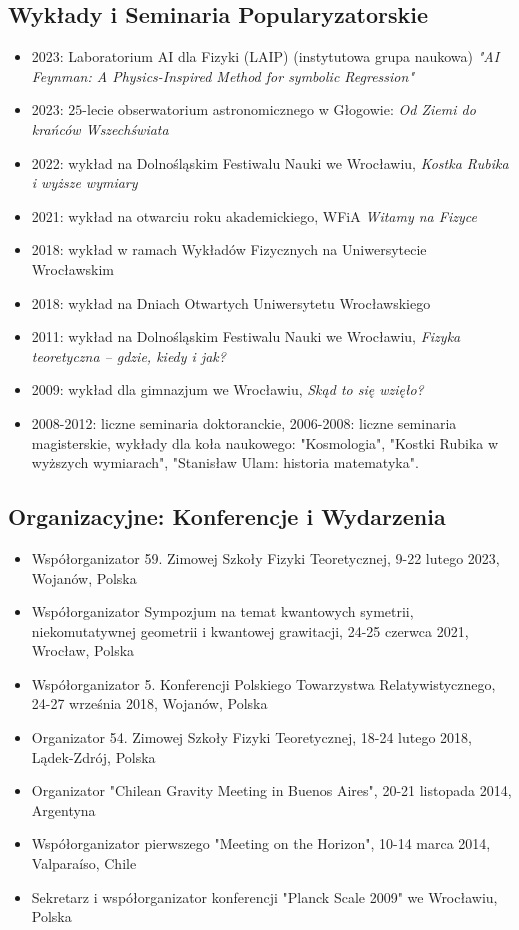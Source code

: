 \documentclass[12pt,a4paper]{article}
\begin{document}
\subsection{Wykłady i Seminaria Popularyzatorskie}

\begin{itemize}
	\item 2023: Laboratorium AI dla Fizyki (LAIP) (instytutowa grupa naukowa) \textsl{"AI Feynman: A Physics-Inspired Method for symbolic Regression"}
	\item 2023: $25$-lecie obserwatorium astronomicznego w Głogowie: \textsl{Od Ziemi do krańców Wszechświata}
	\item 2022: wykład na Dolnośląskim Festiwalu Nauki we Wrocławiu, \textsl{Kostka Rubika i wyższe wymiary}
	\item 2021: wykład na otwarciu roku akademickiego, WFiA \textsl{Witamy na Fizyce}
	\item 2018: wykład w ramach Wykładów Fizycznych na Uniwersytecie Wrocławskim
	\item 2018: wykład na Dniach Otwartych Uniwersytetu Wrocławskiego
	\item 2011: wykład na Dolnośląskim Festiwalu Nauki we Wrocławiu, \textsl{Fizyka teoretyczna – gdzie, kiedy i jak?}
	\item 2009: wykład dla gimnazjum we Wrocławiu, \textsl{Skąd to się wzięło?}
	\item 2008-2012: liczne seminaria doktoranckie, 2006-2008: liczne seminaria magisterskie, wykłady dla koła naukowego: "Kosmologia", "Kostki Rubika w wyższych wymiarach", "Stanisław Ulam: historia matematyka".
\end{itemize}

\subsection{Organizacyjne: Konferencje i Wydarzenia}

\begin{itemize}
	\item Współorganizator 59. Zimowej Szkoły Fizyki Teoretycznej, 9-22 lutego 2023, Wojanów, Polska
	\item Współorganizator Sympozjum na temat kwantowych symetrii, niekomutatywnej geometrii i kwantowej grawitacji, 24-25 czerwca 2021, Wrocław, Polska
	\item Współorganizator 5. Konferencji Polskiego Towarzystwa Relatywistycznego, 24-27 września 2018, Wojanów, Polska
	\item Organizator 54. Zimowej Szkoły Fizyki Teoretycznej, 18-24 lutego 2018, Lądek-Zdrój, Polska
	\item Organizator "Chilean Gravity Meeting in Buenos Aires", 20-21 listopada 2014, Argentyna
	\item Współorganizator pierwszego "Meeting on the Horizon", 10-14 marca 2014, Valparaíso, Chile
	\item Sekretarz i współorganizator konferencji "Planck Scale 2009" we Wrocławiu, Polska
\end{itemize}
\end{document}
